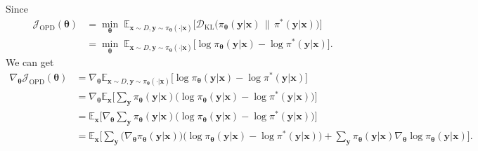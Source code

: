 \documentclass{article} %
\begin{document}
Since 
\begin{equation}
\begin{aligned}
\mathcal{J}_{\text{OPD}}(\boldsymbol{\theta}) &=  \min_{\boldsymbol{\theta}}\;
\mathbb{E}_{\boldsymbol{x} \sim D, \boldsymbol{y} \sim \pi_{\boldsymbol{\theta}} (\cdot | \boldsymbol{x}) }\Big[
\mathcal{D}_{\mathrm{KL}} \!\big(
\pi_{\boldsymbol{\theta}}(\boldsymbol{y} | \boldsymbol{x})
\,\big\|\,
\pi^{*}( \boldsymbol{y} | \boldsymbol{x})
\big)
\Big] \\ & = \min_{\boldsymbol{\theta}}\;
\mathbb{E}_{\boldsymbol{x} \sim D, \boldsymbol{y} \sim \pi_{\boldsymbol{\theta}} (\cdot | \boldsymbol{x}) }\Big[
\log \pi_{\boldsymbol{\theta}}(\boldsymbol{y}| \boldsymbol{x} ) - \log \pi^{*}(\boldsymbol{y}| \boldsymbol{x} )
\Big].
\end{aligned}
\end{equation}
We can get
\begin{equation}
\begin{aligned}
\label{eq: derive opd grad}
\nabla_{\boldsymbol{\theta}} \mathcal{J}_{\text{OPD}}(\boldsymbol{\theta}) &=  
\nabla_{\boldsymbol{\theta}}  \mathbb{E}_{\boldsymbol{x} \sim D, \boldsymbol{y} \sim \pi_{\boldsymbol{\theta}} (\cdot | \boldsymbol{x}) }\Big[
\log \pi_{\boldsymbol{\theta}}(\boldsymbol{y}| \boldsymbol{x} ) - \log \pi^{*}(\boldsymbol{y}| \boldsymbol{x} )
\Big] \\ &=
\nabla_{\boldsymbol{\theta}}  \mathbb{E}_{\boldsymbol{x}} \Big[ \sum_{\boldsymbol{y}} \pi_{\boldsymbol{\theta}} (\boldsymbol{y}|\boldsymbol{x})\big(  
\log \pi_{\boldsymbol{\theta}}(\boldsymbol{y}| \boldsymbol{x} ) - \log \pi^{*}(\boldsymbol{y}| \boldsymbol{x} )
\big)
\Big] \\ &=
\mathbb{E}_{\boldsymbol{x}}  \Big[ \nabla_{\boldsymbol{\theta}}  \sum_{\boldsymbol{y}} \pi_{\boldsymbol{\theta}} (\boldsymbol{y}|\boldsymbol{x})\big(  
\log \pi_{\boldsymbol{\theta}}(\boldsymbol{y}| \boldsymbol{x} ) - \log \pi^{*}(\boldsymbol{y}| \boldsymbol{x} )
\big)
\Big] \\ &=
\mathbb{E}_{\boldsymbol{x}}  \Big[ \sum_{\boldsymbol{y}} \big(\nabla_{\boldsymbol{\theta}}  \pi_{\boldsymbol{\theta}} (\boldsymbol{y}|\boldsymbol{x}) \big) \big(  
\log \pi_{\boldsymbol{\theta}}(\boldsymbol{y}| \boldsymbol{x} ) - \log \pi^{*}(\boldsymbol{y}| \boldsymbol{x} )
\big) + \sum_{\boldsymbol{y}} \pi_{\boldsymbol{\theta}}  (\boldsymbol{y}| \boldsymbol{x} ) \nabla_{\boldsymbol{\theta}}   \log \pi_{\boldsymbol{\theta}}(\boldsymbol{y}| \boldsymbol{x} )
\Big]  .
\end{aligned}
\end{equation}
\end{document}

